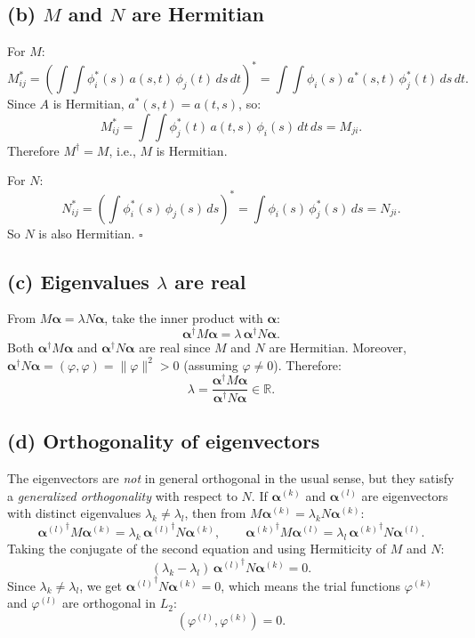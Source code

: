\documentclass[12pt]{article}
\begin{document}
\subsection*{(b) $M$ and $N$ are Hermitian}

For $M$:
\[
M_{ij}^* = \left(\int\!\!\int \phi_i^*(s)\,a(s,t)\,\phi_j(t)\,ds\,dt\right)^* = \int\!\!\int \phi_i(s)\,a^*(s,t)\,\phi_j^*(t)\,ds\,dt.
\]
Since $A$ is Hermitian, $a^*(s,t) = a(t,s)$, so:
\[
M_{ij}^* = \int\!\!\int \phi_j^*(t)\,a(t,s)\,\phi_i(s)\,dt\,ds = M_{ji}.
\]
Therefore $M^\dagger = M$, i.e., $M$ is Hermitian.

For $N$:
\[
N_{ij}^* = \left(\int \phi_i^*(s)\,\phi_j(s)\,ds\right)^* = \int \phi_i(s)\,\phi_j^*(s)\,ds = N_{ji}.
\]
So $N$ is also Hermitian. \hfill $\square$

\subsection*{(c) Eigenvalues $\lambda$ are real}

From $M\boldsymbol{\alpha} = \lambda N\boldsymbol{\alpha}$, take the inner product with $\boldsymbol{\alpha}$:
\[
\boldsymbol{\alpha}^\dagger M \boldsymbol{\alpha} = \lambda\,\boldsymbol{\alpha}^\dagger N \boldsymbol{\alpha}.
\]
Both $\boldsymbol{\alpha}^\dagger M \boldsymbol{\alpha}$ and $\boldsymbol{\alpha}^\dagger N \boldsymbol{\alpha}$ are real since $M$ and $N$ are Hermitian. Moreover, $\boldsymbol{\alpha}^\dagger N \boldsymbol{\alpha} = (\varphi, \varphi) = \|\varphi\|^2 > 0$ (assuming $\varphi \neq 0$). Therefore:
\[
\lambda = \frac{\boldsymbol{\alpha}^\dagger M \boldsymbol{\alpha}}{\boldsymbol{\alpha}^\dagger N \boldsymbol{\alpha}} \in \mathbb{R}.
\]

\subsection*{(d) Orthogonality of eigenvectors}

The eigenvectors are \emph{not} in general orthogonal in the usual sense, but they satisfy a \emph{generalized orthogonality} with respect to $N$. If $\boldsymbol{\alpha}^{(k)}$ and $\boldsymbol{\alpha}^{(l)}$ are eigenvectors with distinct eigenvalues $\lambda_k \neq \lambda_l$, then from $M\boldsymbol{\alpha}^{(k)} = \lambda_k N\boldsymbol{\alpha}^{(k)}$:
\[
{\boldsymbol{\alpha}^{(l)}}^\dagger M \boldsymbol{\alpha}^{(k)} = \lambda_k\,{\boldsymbol{\alpha}^{(l)}}^\dagger N \boldsymbol{\alpha}^{(k)}, \qquad {\boldsymbol{\alpha}^{(k)}}^\dagger M \boldsymbol{\alpha}^{(l)} = \lambda_l\,{\boldsymbol{\alpha}^{(k)}}^\dagger N \boldsymbol{\alpha}^{(l)}.
\]
Taking the conjugate of the second equation and using Hermiticity of $M$ and $N$:
\[
(\lambda_k - \lambda_l)\,{\boldsymbol{\alpha}^{(l)}}^\dagger N \boldsymbol{\alpha}^{(k)} = 0.
\]
Since $\lambda_k \neq \lambda_l$, we get ${\boldsymbol{\alpha}^{(l)}}^\dagger N \boldsymbol{\alpha}^{(k)} = 0$, which means the trial functions $\varphi^{(k)}$ and $\varphi^{(l)}$ are orthogonal in $L_2$:
\[
(\varphi^{(l)}, \varphi^{(k)}) = 0.
\]
\end{document}

